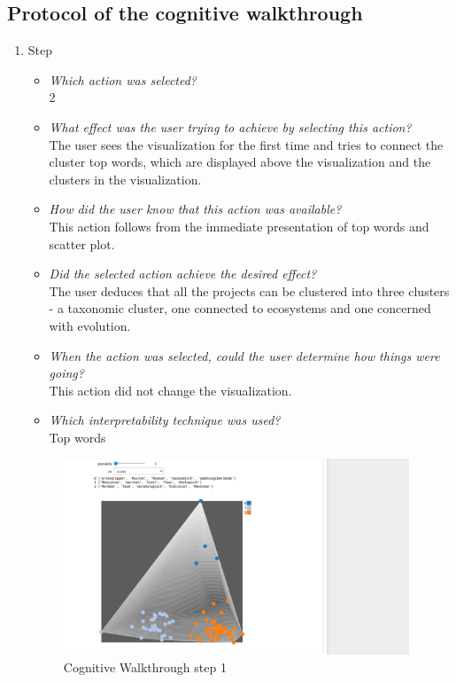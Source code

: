 \subsection{Protocol of the cognitive walkthrough}
{\fontsize{11}{13}\selectfont
	\begin{enumerate}
		\item Step
		\begin{itemize}
			\item \textit{Which action was selected?} \\
			2
			\item \textit{What effect was the user trying to achieve by selecting this action?} \\
			The user sees the visualization for the first time and tries to connect the cluster top words, which are displayed above the visualization and the clusters in the visualization. 
			\item \textit{How did the user know that this action was available?} \\
			This action follows from the immediate presentation of top words and scatter plot. 
			\item \textit{Did the selected action achieve the desired effect?} \\
			The user deduces that all the projects can be clustered into three clusters - a taxonomic cluster, one connected to ecosystems and one concerned with evolution. 
			\item \textit{When the action was selected, could the user determine how things were going?} \\
			This action did not change the visualization.
			\item \textit{Which interpretability technique was used?}\\
			Top words
		\end{itemize}
		\begin{figure}[H]
			\centering
			\includegraphics[width=390px]{../chapters/validation/pics/1_c}
			\caption{\label{pic:step1} Cognitive Walkthrough step 1}
		\end{figure} \newpage
		

\end{enumerate}}
